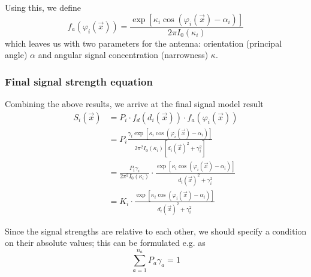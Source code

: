 \documentclass[a4paper]{article}
\begin{document}
Using this, we define
\begin{equation}
f_a(\varphi_i(\vec{x})) = \frac
    {\exp{[\kappa_i \cos{(\varphi_i(\vec{x}) - \alpha_i)}]}}
    {2\pi I_0(\kappa_i)}
\end{equation}
which leaves us with two parameters for the antenna: orientation (principal
angle) $\alpha$ and angular signal concentration (narrowness) $\kappa$.

\subsubsection{Final signal strength equation}
Combining the above results, we arrive at the final signal model result
\begin{align}
S_i(\vec{x}) &= P_i \cdot f_d(d_i(\vec{x})) \cdot f_a(\varphi_i(\vec{x}))\\
&= P_i \frac
    {\gamma_i \exp{[\kappa_i \cos{(\varphi_i(\vec{x}) - \alpha_i)}]}}
    {2\pi^2 I_0(\kappa_i) [d_i(\vec{x})^2 + \gamma_i^2]}\\
&= \frac{P_i \gamma_i}{2\pi^2 I_0(\kappa_i)} \cdot \frac
    {\exp{[\kappa_i \cos{(\varphi_i(\vec{x}) - \alpha_i)}]}}
    {d_i(\vec{x})^2 + \gamma_i^2}\\
&= K_i \cdot \frac
    {\exp{[\kappa_i \cos{(\varphi_i(\vec{x}) - \alpha_i)}]}}
    {d_i(\vec{x})^2 + \gamma_i^2}
\end{align}

Since the signal strengths are relative to each other, we should specify a
condition on their absolute values; this can be formulated e.g. as
\begin{equation} \label{eq:powersumcond}
\sum_{a=1}^{n_a} P_a \gamma_a = 1
\end{equation}
\end{document}
